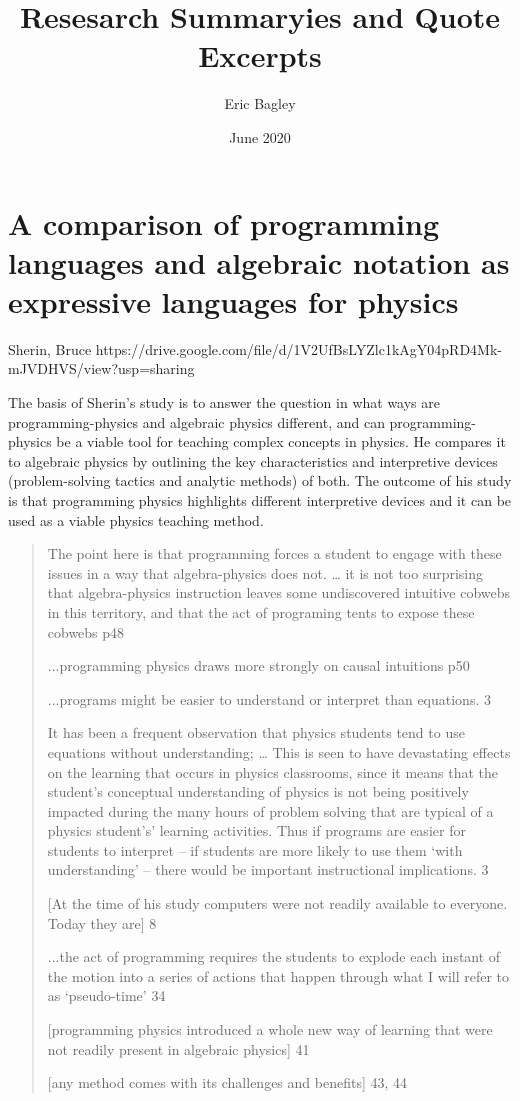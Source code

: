 \documentclass[12pt]{extarticle}
\title{Resesarch Summaryies and Quote Excerpts}
\author{Eric Bagley}
\date{June 2020}
\begin{document}
\maketitle

\section{A comparison of programming languages and algebraic notation as expressive languages for physics}
Sherin, Bruce
https://drive.google.com/file/d/1V2UfBsLYZlc1kAgY04pRD4Mk-mJVDHVS/view?usp=sharing 

The basis of Sherin’s study is to answer the question in what ways are programming-physics and algebraic physics different, and can programming-physics be a viable tool for teaching complex concepts in physics. He compares it to algebraic physics by outlining the key characteristics and interpretive devices (problem-solving tactics and analytic methods) of both. The outcome of his study is that programming physics highlights different interpretive devices and it can be used as a viable physics teaching method.

\begin{quotation}
The point here is that programming forces a student to engage with these issues in a way that algebra-physics does not. … it is not too surprising that algebra-physics instruction leaves some undiscovered intuitive cobwebs in this territory, and that the act of programing tents to expose these cobwebs 	p48

...programming physics draws more strongly on causal intuitions	p50

...programs might be easier to understand or interpret than equations. 	3

It has been a frequent observation that physics students tend to use equations without understanding; … This is seen to have devastating effects on the learning that occurs in physics classrooms, since it means that the student’s conceptual understanding of physics is not being positively impacted during the many hours of problem solving that are typical of a physics student’s’ learning activities. Thus if programs are easier for students to interpret -- if students are more likely to use them ‘with understanding’ -- there would be important instructional implications. 		3

[At the time of his study computers were not readily available to everyone. Today they are] 	8

...the act of programming requires the students to explode each instant of the motion into a series of actions that happen through what I will refer to as ‘pseudo-time’	34

[programming physics introduced a whole new way of learning that were not readily present in algebraic physics] 	41

[any method comes with its challenges and benefits]	43, 44
\end{quotation}
	
\end{document}
